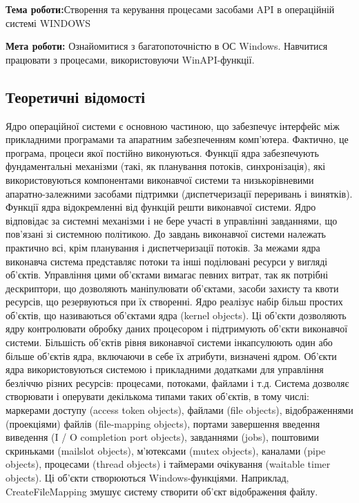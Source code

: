\documentclass[12pt]{extarticle}
\begin{document}
\textbf{Тема роботи:}Створення та керування процесами засобами API в операційній
системі WINDOWS
\vspace{12pt}

\textbf{Мета роботи:} Ознайомитися з багатопоточністю в ОС Windows. Навчитися
працювати з процесами, використовуючи WinAPI-функції.

\subsection*{Теоретичні відомості}
Ядро операційної системи є основною частиною, що забезпечує
інтерфейс між прикладними програмами та апаратним забезпеченням
комп’ютера. Фактично, це програма, процеси якої постійно виконуються.
Функції ядра забезпечують фундаментальні механізми (такі, як
планування потоків, синхронізація), які використовуються компонентами
виконавчої системи та низькорівневими апаратно-залежними засобами
підтримки (диспетчеризації переривань і винятків).
Функції ядра відокремленні від функцій решти виконавчої системи.
Ядро відповідає за системні механізми і не бере участі в управлінні
завданнями, що пов'язані зі системною політикою. До завдань виконавчої
системи належать практично всі, крім планування і диспетчеризації
потоків.
За межами ядра виконавча система представляє потоки та інші
поділювані ресурси у вигляді об'єктів. Управління цими об'єктами
вимагає певних витрат, так як потрібні дескриптори, що дозволяють
маніпулювати об'єктами, засоби захисту та квоти ресурсів, що
резервуються при їх створенні. Ядро реалізує набір більш простих
об'єктів, що називаються об'єктами ядра (kernel objects). Ці об'єкти
дозволяють ядру контролювати обробку даних процесором і підтримують
об'єкти виконавчої системи. Більшість об'єктів рівня виконавчої системи
інкапсулюють один або більше об'єктів ядра, включаючи в себе їх
атрибути, визначені ядром. Об'єкти ядра використовуються системою і
прикладними додатками для управління безліччю різних ресурсів:
процесами, потоками, файлами і т.д.
Система дозволяє створювати і оперувати декількома типами таких
об'єктів, в тому числі: маркерами доступу (access token objects), файлами
(file objects), відображеннями (проекціями) файлів (file-mapping objects),
портами завершення введення виведення (I / O completion port objects),
завданнями (jobs), поштовими скриньками (mailslot objects), м'ютексами
(mutex objects), каналами (pipe objects), процесами (thread objects) і
таймерами очікування (waitable timer objects). Ці об'єкти створюються
Windows-функціями. Наприклад, CreateFileMapping змушує систему
створити об'єкт відображення файлу.
\end{document}
